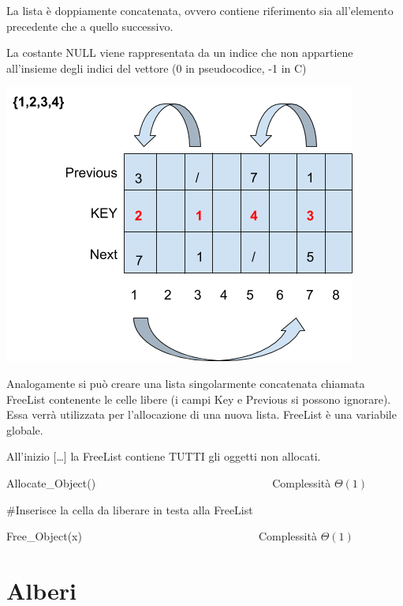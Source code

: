 \documentclass{article}
\begin{document}
{{{{}

{La lista è doppiamente concatenata, ovvero contiene riferimento sia
all'elemento precedente che a quello successivo.}

{}

{La costante NULL viene rappresentata da un indice che non appartiene
all'insieme degli indici del vettore (0 in pseudocodice, -1 in C)}

{}

{\includegraphics{images/image520.png}}

{}

{}

{Analogamente si può creare una lista singolarmente concatenata chiamata FreeList contenente le celle libere (i campi Key e Previous si possono ignorare). Essa verrà utilizzata per l'allocazione di una nuova lista. FreeList è una variabile globale.}

{All'inizio {[}\ldots{}{]} la FreeList contiene TUTTI gli oggetti non allocati.}

{Allocate\_Object()~~~~~~~~~~~~~~~~~~~~~~~~~~~~~~~~}{Complessità $\Theta(1)$}



{\#Inserisce la cella da liberare in testa alla FreeList}

{Free\_Object(x)}{~~~~~~~~~~~~~~~~~~~~~~~~~~~~~~~~Complessità $\Theta(1)$}



\section{Alberi}

}}}
\end{document}
